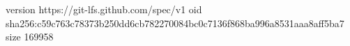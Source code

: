 version https://git-lfs.github.com/spec/v1
oid sha256:c59c763c78373b250dd6cb782270084bc0c7136f868ba996a8531aaa8aff5ba7
size 169958
